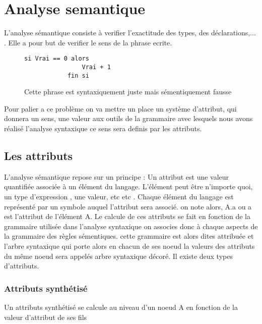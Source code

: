\section{Analyse semantique}
L'analyse sémantique consiste à verifier l'exactitude des types, des
    déclarations,... . Elle a pour but de verifier le sens de la phrase ecrite.
    
    \begin{figure}[h]
        \begin{lstlisting}[style=base]
            si Vrai == 0 alors
                Vrai + 1
            fin si \end{lstlisting}
        Cette phrase est syntaxiquement juste mais sémentiquement fausse
    \end{figure}
    
Pour palier a ce problème on va mettre un place un système d'attribut, qui
donnera un sens, une valeur aux outils de la grammaire avec lesquels nous
avons réalisé l'analyse syntaxique ce sens sera definis par les attributs.

\subsection{Les attributs}
    L'analyse sémantique repose sur un principe : 
	Un attribut est une valeur quantifiée associée à un
    élément du langage. L'élément peut être n'importe quoi, un type d'expression
    , une valeur, etc etc . Chaque élément du langage est représenté par un
    symbole 
    auquel l'attribut sera associé. on note alors, A.a ou a est l'attribut de 
    l'élément A. Le calcule de ces attributs se fait en fonction de la
    grammaire utilisée dans l'analyse syntaxique on associes donc à chaque
    aspects de la grammaire des règles sémentiques. cette grammaire est alors
    dites attribuée et l'arbre syntaxique qui porte alors en chacun de ses
    noeud la valeurs des attributs du même noeud sera appelés arbre syntaxique
    décoré. Il existe deux types d'attributs.

\subsubsection{Attributs synthétisé}
	Un attributs synthétisé se calcule au niveau d'un noeud A en fonction de la valeur d'attribut de ses fils \\
	

